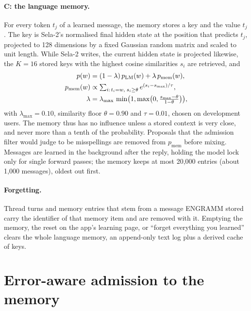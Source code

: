 \documentclass[10pt,twocolumn]{article}
\begin{document}
\paragraph{C: the language memory.} For every token $t_j$ of a learned message, the memory stores a key and the value
$t_j$. The key is Sela-2's normalised final hidden state at the position that predicts $t_j$, projected to 128
dimensions by a fixed Gaussian random matrix \citep{johnson1984extensions} and scaled to unit length. While Sela-2
writes, the current hidden state is projected likewise, the $K = 16$ stored keys with the highest cosine similarities
$s_i$ are retrieved, and
\begin{align}
p(w) &= (1-\lambda)\,p_{\mathrm{LM}}(w) + \lambda\,p_{\mathrm{mem}}(w), \label{eq:mix}\\
p_{\mathrm{mem}}(w) &\propto \textstyle\sum_{i:\,t_i = w,\; s_i \geq \theta} e^{(s_i - s_{\max})/\tau},\notag\\
\lambda &= \lambda_{\max}\,\textstyle\min\!\big(1, \max\!\big(0, \frac{s_{\max}-\theta}{1-\theta}\big)\big),\notag
\end{align}
with $\lambda_{\max} = 0.10$, similarity floor $\theta = 0.90$ and $\tau = 0.01$, chosen on development users. The memory
thus has no influence unless a stored context is very close, and never more than a tenth of the probability. Proposals
that the admission filter would judge to be misspellings are removed from $p_{\mathrm{mem}}$ before mixing. Messages are
learned in the background after the reply, holding the model lock only for single forward passes; the memory keeps at
most 20{,}000 entries (about 1{,}000 messages), oldest out first.

\paragraph{Forgetting.} Thread turns and memory entries that stem from a message ENGRAMM stored carry the identifier of
that memory item and are removed with it. Emptying the memory, the reset on the app's learning page, or ``forget
everything you learned'' clears the whole language memory, an append-only text log plus a derived cache of keys.

\section{Error-aware admission to the memory}\label{sec:filter}
\end{document}
